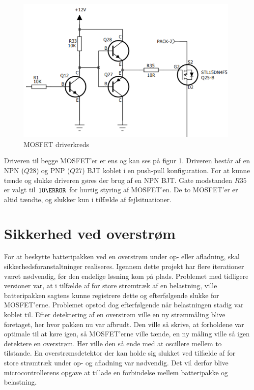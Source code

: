 \begin{figure}[h]
	\centering
	\includegraphics[width=11cm]{billeder/mosfet_driver.png}
	\caption{MOSFET driverkreds}
	\label{fig:mosfet_driver}
\end{figure}

Driveren til begge MOSFET'er er ens og kan ses på figur \ref{fig:mosfet_driver}. Driveren består af en NPN ($Q28$) og PNP ($Q27$) BJT koblet i en push-pull konfiguration. For at kunne tænde og slukke driveren gøres der brug af en NPN BJT. Gate modstanden $R35$ er valgt til $10\ohm$ for hurtig styring af MOSFET'en. De to MOSFET'er er altid tændte, og slukker kun i tilfælde af fejlsituationer.

\section{Sikkerhed ved overstrøm}
For at beskytte batteripakken ved en overstrøm under op- eller afladning, skal sikkerhedsforanstaltninger realiseres. Igennem dette projekt har flere iterationer været nødvendig, før den endelige løsning kom på plads. Problemet med tidligere versioner var, at i tilfælde af for store strømtræk af en belastning, ville batteripakken sagtens kunne registrere dette og efterfølgende slukke for MOSFET'erne. Problemet opstod dog efterfølgende når belastningen stadig var koblet til. Efter detektering af en overstrøm ville en ny strømmåling blive foretaget, her hvor pakken nu var afbrudt. Den ville så skrive, at forholdene var optimale til at køre igen, så MOSFET'erne ville tænde, en ny måling ville så igen detektere en overstrøm. Her ville den så ende med at oscillere mellem to tilstande. En overstrømsdetektor der kan holde sig slukket ved tilfælde af for store strømtræk under op- og afladning var nødvendig. Det vil derfor blive microcontrollerens opgave at tillade en forbindelse mellem batteripakke og belastning.
\\

